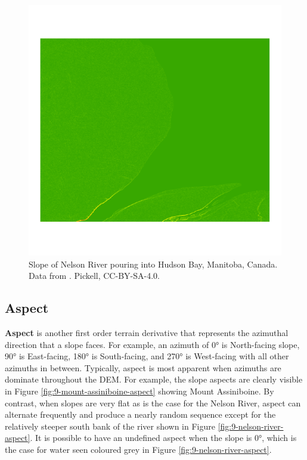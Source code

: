 \documentclass[
]{book}
\begin{document}
\begin{figure}
\includegraphics[width=0.75\linewidth]{images/09-nelson-river-slope} \caption{Slope of Nelson River pouring into Hudson Bay, Manitoba, Canada. Data from \citep{earth_resources_observation_and_science_center_usgs_2018}. Pickell, CC-BY-SA-4.0.}\label{fig:9-nelson-river-slope}
\end{figure}

\subsection{Aspect}\label{aspect}

\textbf{Aspect} is another first order terrain derivative that represents the azimuthal direction that a slope faces. For example, an azimuth of 0° is North-facing slope, 90° is East-facing, 180° is South-facing, and 270° is West-facing with all other azimuths in between. Typically, aspect is most apparent when azimuths are dominate throughout the DEM. For example, the slope aspects are clearly visible in Figure \ref{fig:9-mount-assiniboine-aspect} showing Mount Assiniboine. By contrast, when slopes are very flat as is the case for the Nelson River, aspect can alternate frequently and produce a nearly random sequence except for the relatively steeper south bank of the river shown in Figure \ref{fig:9-nelson-river-aspect}. It is possible to have an undefined aspect when the slope is 0°, which is the case for water seen coloured grey in Figure \ref{fig:9-nelson-river-aspect}.
\end{document}
